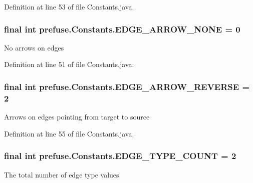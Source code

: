\-Definition at line 53 of file \-Constants.\-java.

\hypertarget{interfaceprefuse_1_1_constants_af4429ca57fecba42267f8e8c0047d5da}{
\subsubsection[{\-E\-D\-G\-E\-\_\-\-A\-R\-R\-O\-W\-\_\-\-N\-O\-N\-E}]{\setlength{\rightskip}{0pt plus 5cm}final int {\bf prefuse.\-Constants.\-E\-D\-G\-E\-\_\-\-A\-R\-R\-O\-W\-\_\-\-N\-O\-N\-E} = 0}}\label{interfaceprefuse_1_1_constants_af4429ca57fecba42267f8e8c0047d5da}
\-No arrows on edges 

\-Definition at line 51 of file \-Constants.\-java.

\hypertarget{interfaceprefuse_1_1_constants_adf52f4b892adf2f1281409582f3ceb53}{
\subsubsection[{\-E\-D\-G\-E\-\_\-\-A\-R\-R\-O\-W\-\_\-\-R\-E\-V\-E\-R\-S\-E}]{\setlength{\rightskip}{0pt plus 5cm}final int {\bf prefuse.\-Constants.\-E\-D\-G\-E\-\_\-\-A\-R\-R\-O\-W\-\_\-\-R\-E\-V\-E\-R\-S\-E} = 2}}\label{interfaceprefuse_1_1_constants_adf52f4b892adf2f1281409582f3ceb53}
\-Arrows on edges pointing from target to source 

\-Definition at line 55 of file \-Constants.\-java.

\hypertarget{interfaceprefuse_1_1_constants_a0f3b3a3de8ec584e896d80a22e192696}{
\subsubsection[{\-E\-D\-G\-E\-\_\-\-T\-Y\-P\-E\-\_\-\-C\-O\-U\-N\-T}]{\setlength{\rightskip}{0pt plus 5cm}final int {\bf prefuse.\-Constants.\-E\-D\-G\-E\-\_\-\-T\-Y\-P\-E\-\_\-\-C\-O\-U\-N\-T} = 2}}\label{interfaceprefuse_1_1_constants_a0f3b3a3de8ec584e896d80a22e192696}
\-The total number of edge type values 

